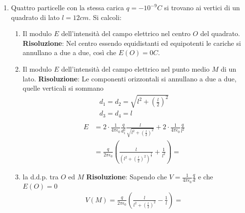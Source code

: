\documentclass{article}
\begin{document}
\begin{enumerate}
\begin{enumerate}
    \end{enumerate}
    \item Quattro particelle con la stessa carica $q = -10^{-9} C$ si trovano ai vertici di un quadrato di lato $l = 12 cm$. Si calcoli:
    \begin{enumerate}
        \item Il modulo $E$ dell’intensità del campo elettrico nel centro $O$ del quadrato.
        \newline
        \textbf{Risoluzione}: Nel centro essendo equidistanti ed equipotenti le cariche si annullano a due a due, così che $E(O) = 0C$.
        \item Il modulo $E$ dell’intensità del campo elettrico nel punto medio $M$ di un lato.
        \newline
        \textbf{Risoluzione}: Le componenti orizzontali si annullano a due a due, quelle verticali si sommano
        \begin{align*}
            d_1 = d_2 = \sqrt{l^2 + \left( \frac{l}{2}\right)^2} \\
            d_3 = d_4 = l \\
        \end{align*}
        \begin{align*}
            E & = 2 \cdot \frac{1}{4 \pi \epsilon_0} \frac{q}{d_{1}^{2}} \frac{l}{\sqrt{l^2 + \left( \frac{l}{2}\right)^2} } + 2 \cdot \frac{1}{4 \pi \epsilon_0} \frac{q}{l^{2}} \\
              & = \frac{q}{2 \pi \epsilon_0} \left( \frac{l}{\left( l^2 + \left( \frac{l}{2} \right)^2 \right)^\frac{3}{2}} + \frac{1}{l^2} \right) = 
        \end{align*}
        \item la d.d.p. tra $O$ ed $M$
        \newline
        \textbf{Risoluzione}: Sapendo che $V = \frac{1}{4 \pi \epsilon_0} \frac{q}{d}$ e che $E(O) = 0$
        \begin{align*}
            V(M) = \frac{q}{2 \pi \epsilon_0} \left( \frac{l}{ l^2 + \left( \frac{l}{2} \right)^2 } - \frac{1}{l} \right) = 
        \end{align*} 

    \end{enumerate}

\end{enumerate}
\end{document}
